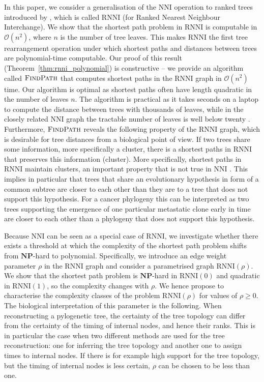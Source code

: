 \documentclass[11pt]{amsart}
\newcommand{\rnni}{\mathrm{RNNI}}
\newcommand{\findpath}{\textsc{FindPath}}
\newcommand{\nni}{\mathrm{NNI}}
\newcommand{\np}{\mathbf{NP}}
\renewcommand{\O}{\mathcal O}
\begin{document}
In this paper, we consider a generalisation of the $\nni$ operation to ranked trees introduced by \textcite{Gavryushkin2018-ol}, which is called $\rnni$ (for Ranked Nearest Neighbour Interchange).
We show that the shortest path problem in $\rnni$ is computable in $\O(n^2)$, where $n$ is the number of tree leaves.
This makes $\rnni$ the first tree rearrangement operation under which shortest paths and distances between trees are polynomial-time computable.
Our proof of this result (Theorem~\ref{thm:rnni_polynomial}) is constructive -- we provide an algorithm called $\findpath$ that computes shortest paths in the $\rnni$ graph in $\O(n^2)$ time.
Our algorithm is optimal as shortest paths often have length quadratic in the number of leaves $n$.
The algorithm is practical as it takes seconds on a laptop to compute the distance between trees with thousands of leaves, while in the closely related $\nni$ graph the tractable number of leaves is well below twenty \autocite{Li1996-zw, Whidden2016-kl}.
Furthermore, $\findpath$ reveals the following property of the $\rnni$ graph, which is desirable for tree distances from a biological point of view.
If two trees share some information, more specifically a cluster, there is a shortest paths in $\rnni$ that preserves this information (cluster).
More specifically, shortest paths in $\rnni$ maintain clusters, an important property that is not true in $\nni$ \autocite{Li1996-zw}.
This implies in particular that trees that share an evolutionary hypothesis in form of a common subtree are closer to each other than they are to a tree that does not support this hypothesis.
For a cancer phylogeny this can be interpreted as two trees supporting the emergence of one particular metastatic clone early in time are closer to each other than a phylogeny that does not support this hypothesis.

Because $\nni$ can be seen as a special case of $\rnni$, we investigate whether there exists a threshold at which the complexity of the shortest path problem shifts from $\np$-hard to polynomial.
Specifically, we introduce an edge weight parameter $\rho$ in the $\rnni$ graph and consider a parametrised graph $\rnni(\rho)$.
We show that the shortest path problem is $\np$-hard in $\rnni(0)$ and quadratic in $\rnni(1)$, so the complexity changes with $\rho$.
We hence propose to characterise the complexity classes of the problem $\rnni(\rho)$ for values of $\rho \geq 0$.
The biological interpretation of this parameter is the following.
When reconstructing a pylogenetic tree, the certainty of the tree topology can differ from the certainty of the timing of internal nodes, and hence their ranks.
This is in particular the case when two different methods are used for the tree reconstruction: one for inferring the tree topology and another one to assign times to internal nodes.
If there is for example high support for the tree topology, but the timing of internal nodes is less certain, $\rho$ can be chosen to be less than one.
\end{document}
